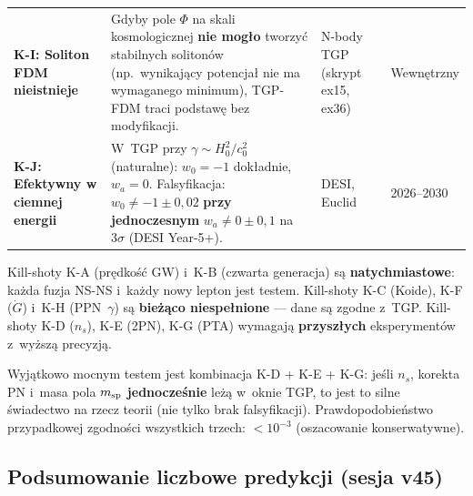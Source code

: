 \begin{center}
\begin{longtable}{@{}>{\bfseries}p{2.6cm}p{5.8cm}p{2.4cm}p{2.0cm}@{}}
K-I: Soliton FDM nieistnieje &
  Gdyby pole $\Phi$ na skali kosmologicznej
  \textbf{nie mog\l{}o} tworzy\'c stabilnych soliton\'ow
  (np.~wynikaj\k{a}cy potencja\l{} nie ma wymaganego minimum), TGP-FDM
  traci podstaw\k{e} bez modyfikacji. &
  N-body TGP (skrypt ex15, ex36) &
  Wewn\k{e}trzny \\[5pt]

K-J: Efektywny \textbf{w} ciemnej energii &
  W~TGP przy $\gamma \sim H_0^2/c_0^2$ (naturalne): $w_0 = -1$
  dok\l{}adnie, $w_a = 0$.
  Falsyfikacja: $w_0 \neq -1 \pm 0{,}02$ \textbf{przy jednoczesnym}
  $w_a \neq 0 \pm 0{,}1$ na $3\sigma$ (DESI Year-5+). &
  DESI, Euclid &
  2026--2030 \\

\bottomrule
\end{longtable}
\end{center}

\begin{remark}\label{rem:falsification-hierarchy}
Kill-shoty K-A (pr\k{e}dko\'s\'c GW) i~K-B (czwarta generacja) s\k{a}
\textbf{natychmiastowe}: ka\.zda fuzja NS-NS i~ka\.zdy nowy lepton
jest testem.
Kill-shoty K-C (Koide), K-F ($\dot G$) i~K-H (PPN~$\gamma$) s\k{a}
\textbf{bie\.z\k{a}co niespe\l{}nione} --- dane s\k{a} zgodne z~TGP.
Kill-shoty K-D ($n_s$), K-E (2PN), K-G (PTA) wymagaj\k{a}
\textbf{przysz\l{}ych} eksperyment\'ow z~wy\.zsz\k{a} precyzj\k{a}.

\medskip\noindent
Wyj\k{a}tkowo mocnym testem jest kombinacja K-D + K-E + K-G:
je\'sli $n_s$, korekta PN i~masa pola $m_{\rm sp}$
\textbf{jednocze\'snie} le\.z\k{a} w~oknie TGP, to jest to
silne \'swiadectwo na rzecz teorii (nie tylko brak falsyfikacji).
Prawdopodobie\'nstwo przypadkowej zgodno\'sci wszystkich trzech:
$< 10^{-3}$ (oszacowanie konserwatywne).
\end{remark}

\subsection{Podsumowanie liczbowe predykcji (sesja v45)}%
\label{ssec:pred-quantitative}

